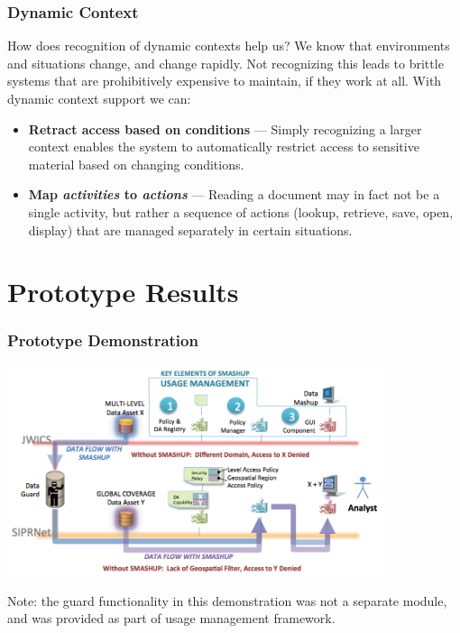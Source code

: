 \documentclass[t,handout, 10pt]{beamer}
\begin{document}
\begin{frame}
\frametitle{Dynamic Context}
How does recognition of dynamic contexts help us?
\newline
\newline
\pause
We know that environments and situations change, and change rapidly.  Not recognizing this leads to brittle systems that are prohibitively expensive to maintain, if they work at all.
\newline
\newline
\pause
With dynamic context support we can:
\begin{itemize}
\item \textbf{Retract access based on conditions} --- Simply recognizing a larger context enables the system to automatically restrict access to sensitive material based on changing conditions.
\pause
\item\textbf{Map \textit{activities} to \textit{actions}} --- Reading a document may in fact not be a single activity, but rather a sequence of actions (lookup, retrieve, save, open, display) that are managed separately in certain situations.
\end{itemize}
\end{frame}

\section{Prototype Results}

\begin{frame}\frametitle{Prototype Demonstration}
\vspace*{-0.1in}
  \centerline{\includegraphics[width=4.35in]{demo.png}}
  {\small Note:  the guard functionality in this demonstration was not a separate module, and was provided as part of usage management framework.}
\end{frame} 
\end{document}
